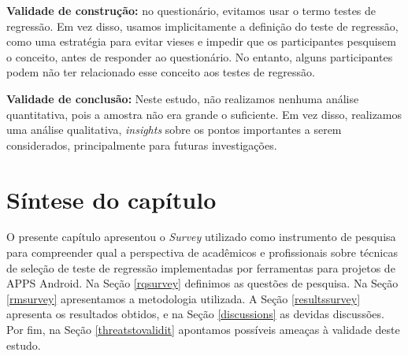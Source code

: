 \textbf{Validade de construção:} no questionário, evitamos usar o termo testes de regressão. Em vez disso, usamos implicitamente a definição do teste de regressão, como uma estratégia para evitar vieses e impedir que os participantes pesquisem o conceito, antes de responder ao questionário. No entanto, alguns participantes podem não ter relacionado esse conceito aos testes de regressão.

\textbf{Validade de conclusão:} Neste estudo, não realizamos nenhuma análise quantitativa, pois a amostra não era grande o suficiente. Em vez disso, realizamos uma análise qualitativa, \textit{insights} sobre os pontos importantes a serem considerados, principalmente para futuras investigações.


\section{Síntese do capítulo}

O presente capítulo apresentou o \textit{Survey} utilizado como instrumento de pesquisa para compreender qual a perspectiva de acadêmicos e profissionais sobre técnicas de seleção de teste de regressão implementadas por ferramentas para projetos de \ac{APPS} Android. Na Seção \ref{rqsurvey} definimos as questões de pesquisa. Na Seção \ref{rmsurvey} apresentamos a metodologia utilizada. A Seção \ref{resultssurvey} apresenta os resultados obtidos, e na Seção \ref{discussions} as devidas discussões. Por fim, na Seção \ref{threatstovalidit} apontamos possíveis ameaças à validade deste estudo.




























